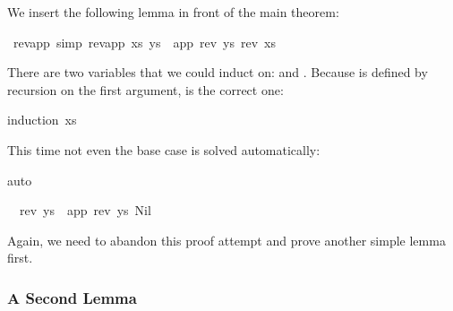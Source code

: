\begin{isabellebody}
\begin{isamarkuptxt}
We insert the following lemma in front of the main theorem:%
\end{isamarkuptxt}%
\isamarkuptrue%
%
\endisatagproof
{\isafoldproof}%
%
\isadelimproof
%
\endisadelimproof
{}\isamarkupfalse%
\ rev{}app\ {}simp{}{}\ {}rev{}app\ xs\ ys{}\ {}\ app\ {}rev\ ys{}\ {}rev\ xs{}{}%
\isadelimproof
%
\endisadelimproof
%
\isatagproof
%
\begin{isamarkuptxt}%
There are two variables that we could induct on:  and
. Because  is defined by recursion on
the first argument,  is the correct one:%
\end{isamarkuptxt}%
\isamarkuptrue%
\isamarkupfalse%
{}induction\ xs{}%
\begin{isamarkuptxt}%
This time not even the base case is solved automatically:%
\end{isamarkuptxt}%
\isamarkuptrue%
\isamarkupfalse%
{}auto{}%
\begin{isamarkuptxt}%
\vspace{-5ex}
\begin{isabelle}%
\ {}{}\ rev\ ys\ {}\ app\ {}rev\ ys{}\ Nil%
\end{isabelle}
Again, we need to abandon this proof attempt and prove another simple lemma
first.

\subsubsection{A Second Lemma}


\end{isamarkuptxt}
\end{isabellebody}

